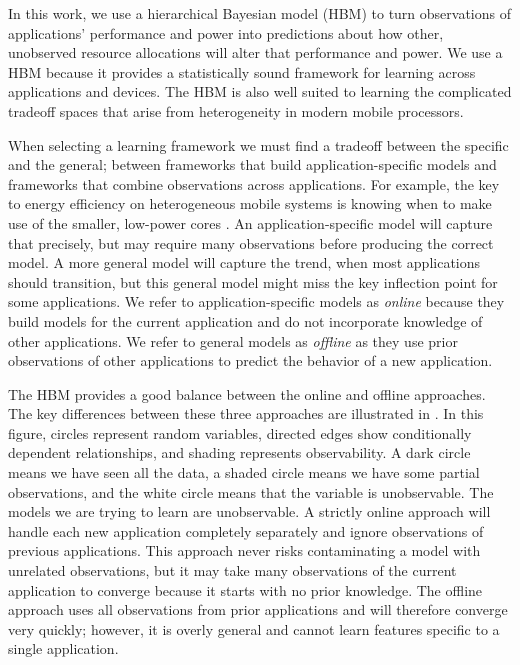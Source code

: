 In this work, we use a hierarchical Bayesian model (HBM) to turn
observations of applications' performance and power into predictions
about how other, unobserved resource allocations will alter that
performance and power.  We use a HBM because it provides a
statistically sound framework for learning across applications and
devices.  The HBM is also well suited to learning the complicated
tradeoff spaces that arise from heterogeneity in modern mobile
processors.

When selecting a learning framework we must find a tradeoff between
the specific and the general; \ie between frameworks that build
application-specific models and frameworks that combine observations
across applications.  For example, the key to energy efficiency on
heterogeneous mobile systems is knowing when to make use of the
smaller, low-power cores \cite{}.  An application-specific model will
capture that precisely, but may require many observations before
producing the correct model.  A more general model will capture the
trend, \eg when most applications should transition, but this general
model might miss the key inflection point for some applications.  We
refer to application-specific models as \emph{online} because they
build models for the current application and do not incorporate
knowledge of other applications.  We refer to general models as
\emph{offline} as they use prior observations of other applications to
predict the behavior of a new application.  

The HBM provides a good balance between the online and offline
approaches.  The key differences between these three approaches are
illustrated in . In this figure, circles
represent random variables, directed edges show conditionally
dependent relationships, and shading represents observability.  A dark
circle means we have seen all the data, a shaded circle means we have
some partial observations, and the white circle means that the
variable is unobservable.  The models we are trying to learn
are unobservable.  A strictly online approach will handle each new
application completely separately and ignore observations of previous
applications.  This approach never risks contaminating a model with
unrelated observations, but it may take many observations of the
current application to converge because it starts with no prior
knowledge. The offline approach uses all observations from prior
applications and will therefore converge very quickly; however, it is
overly general and cannot learn features specific to a single
application.

